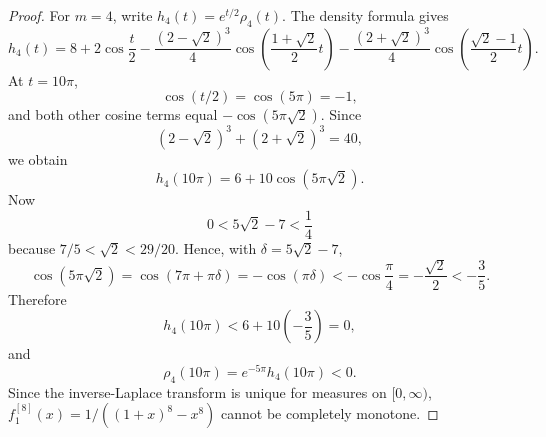 \begin{proof}
For \(m=4\), write \(h_4(t)=e^{t/2}\rho_4(t)\).  The density formula gives
\[
h_4(t)
=8+2\cos\frac t2
-\frac{(2-\sqrt2)^3}{4}
\cos\left(\frac{1+\sqrt2}{2}t\right)
-\frac{(2+\sqrt2)^3}{4}
\cos\left(\frac{\sqrt2-1}{2}t\right).
\]
At \(t=10\pi\),
\[
\cos(t/2)=\cos(5\pi)=-1,
\]
and both other cosine terms equal \(-\cos(5\pi\sqrt2)\).  Since
\[
(2-\sqrt2)^3+(2+\sqrt2)^3=40,
\]
we obtain
\[
h_4(10\pi)=6+10\cos(5\pi\sqrt2).
\]
Now
\[
0<5\sqrt2-7<\frac14
\]
because \(7/5<\sqrt2<29/20\).  Hence, with
\(\delta=5\sqrt2-7\),
\[
\cos(5\pi\sqrt2)=\cos(7\pi+\pi\delta)=-\cos(\pi\delta)
<-\cos\frac\pi4=-\frac{\sqrt2}{2}<-\frac35.
\]
Therefore
\[
h_4(10\pi)<6+10\left(-\frac35\right)=0,
\]
and
\[
\rho_4(10\pi)=e^{-5\pi}h_4(10\pi)<0.
\]
Since the inverse-Laplace transform is unique for measures on
\([0,\infty)\), \(f^{[8]}_1(x)=1/((1+x)^8-x^8)\) cannot be completely monotone.
\end{proof}

